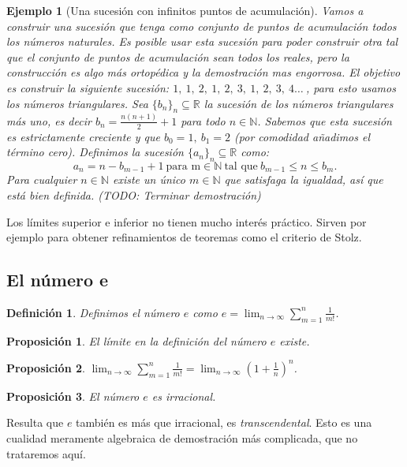 \documentclass{article}
\newtheorem{prop}{Proposición}
\newtheorem{define}{Definición}
\newtheorem{ejem}{Ejemplo}
\newcommand{\reales}{\mathbb{R}}
\newcommand{\naturales}{\mathbb{N}}
\newcommand{\sucreal}[1]{\{ #1 _n \}_n \subseteq \reales}
\begin{document}
\begin{ejem}[Una sucesión con infinitos puntos de acumulación]
	Vamos a construir una sucesión que tenga como conjunto de puntos de acumulación todos los números naturales. Es posible usar esta sucesión para poder construir otra tal que el conjunto de puntos de acumulación sean todos los reales, pero la construcción es algo más ortopédica y la demostración mas engorrosa.
	El objetivo es construir la siguiente sucesión: $1,\ 1,\ 2,\ 1,\ 2,\ 3,\ 1,\ 2,\ 3,\ 4 \ldots\ $, para esto usamos los números triangulares.
	Sea $\sucreal{b}$ la sucesión de los números triangulares más uno, es decir $b_n = \frac{n(n+1)}{2} + 1$ para todo $n \in \naturales$. Sabemos que esta sucesión es estrictamente creciente y que $b_0 = 1,\ b_1 = 2$ (por comodidad añadimos el término cero). Definimos la sucesión $\sucreal{a}$ como:
	\begin{equation*}
		a_n = n - b_{m-1} + 1\ \text{para m} \in \naturales\ \text{tal que}\ b_{m-1} \leq n \leq b_m \text{.}
	\end{equation*}
	Para cualquier $n \in \naturales$ existe un único $m \in \naturales$ que satisfaga la igualdad, así que está bien definida. (TODO: Terminar demostración)
\end{ejem}

Los límites superior e inferior no tienen mucho interés práctico. Sirven por ejemplo para obtener refinamientos de teoremas como el criterio de Stolz.

\subsection{El número e}

\begin{define}
	Definimos el número $e$ como $e = \lim_{n \rightarrow \infty} \sum_{m=1}^{n} \frac{1}{m!}$. 
\end{define}

\begin{prop}
	El límite en la definición del número $e$ existe.
\end{prop}

\begin{prop}
	$\lim_{n \rightarrow \infty} \sum_{m=1}^{n} \frac{1}{m!} = \lim_{n \rightarrow \infty} (1 + \frac{1}{n})^n$.
\end{prop}

\begin{prop}
	El número $e$ es irracional.
\end{prop}
Resulta que $e$ también es más que irracional, es \textit{transcendental}. Esto es una cualidad meramente algebraica de demostración más complicada, que no trataremos aquí.
\end{document}
